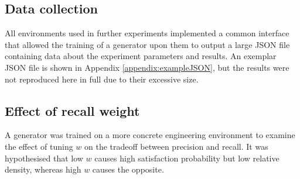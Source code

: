 \documentclass[../../main.tex]{subfiles}
\begin{document}
\subsection{Data collection} \label{subsection:dataCollection}

All environments used in further experiments implemented a common interface that allowed the training of a generator upon them to output a large JSON file containing data about the experiment parameters and results.
An exemplar JSON file is shown in Appendix \ref{appendix:exampleJSON}, but the results were not reproduced here in full due to their excessive size.

\subsection{Effect of recall weight} \label{subsection:effectOfRecallWeight}

A generator was trained on a more concrete engineering environment to examine the effect of tuning $w$ on the tradeoff between precision and recall.
It was hypothesised that low $w$ causes high satisfaction probability but low relative density, whereas high $w$ causes the opposite.
\end{document}
